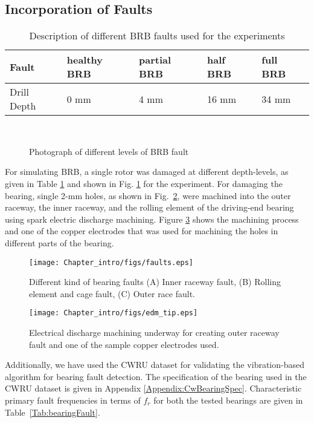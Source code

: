 \subsection{Incorporation of Faults}
\begin{table}
	\renewcommand{\arraystretch}{1.3}
	\caption{Description of different BRB faults used for the experiments} 
	\label{designOfExpt} \centering
	\begin{tabular}{m{2.7cm}|m{2.5cm}m{2.4cm}m{2.1cm}m{2.1cm}}
		\hline \hline
		Fault & healthy BRB & partial BRB & half BRB & full BRB\\
		\hline
		Drill Depth & 0 mm & 4 mm & 16 mm & 34 mm\\
		\hline
	\end{tabular}
\end{table}
%
\begin{figure}[h]
\centering \mbox{  
\qquad
{}}
\caption{Photograph of different levels of BRB fault}
\label{expBRB}
\end{figure}
For simulating BRB, a single rotor was damaged at different depth-levels, as given in Table \ref{designOfExpt} and shown in Fig. \ref{expBRB} for the experiment. For damaging the bearing, single 2-mm holes, as shown in Fig.~\ref{fig:simFault}, were machined into the outer raceway, the inner raceway, and the rolling element of the driving-end bearing using spark electric discharge machining. Figure \ref{Fig:copperTipEdm} shows the machining process and one of the copper electrodes that was used for machining the holes in different parts of the bearing.
%
\begin{figure}[h] \centering
	{\texttt{[image: Chapter\_intro/figs/faults.eps]}}
	\caption{Different kind of bearing faults (A) Inner raceway fault, (B) Rolling element and cage fault, (C) Outer race fault.} \label{fig:simFault}
\end{figure}
\begin{figure}[h] \centering
	{\texttt{[image: Chapter\_intro/figs/edm\_tip.eps]}}
	\caption{Electrical discharge machining underway for creating outer raceway fault and one of the sample copper electrodes used.}
	\label{Fig:copperTipEdm}
\end{figure}
Additionally, we have used the CWRU dataset \cite{caseWestern} for validating the vibration-based algorithm for bearing fault detection. The specification of the bearing used in the CWRU dataset is given in Appendix \ref{Appendix:CwBearingSpec}. Characteristic primary fault frequencies in terms of $f_r$ for both the tested bearings are given in Table~\ref{Tab:bearingFault}.
